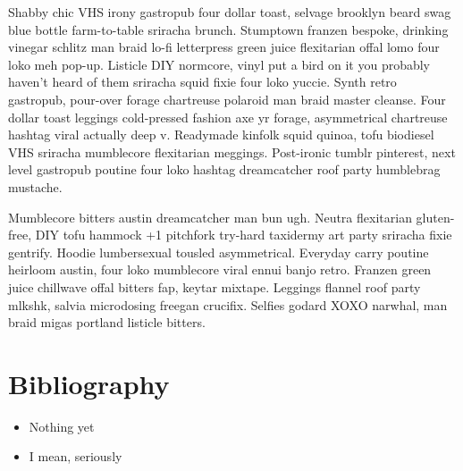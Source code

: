 \documentclass[12pt, a4paper, twoside]{article}
\begin{document}
Shabby chic VHS irony gastropub four dollar toast, selvage brooklyn beard swag blue bottle farm-to-table sriracha brunch. Stumptown franzen bespoke, drinking vinegar schlitz man braid lo-fi letterpress green juice flexitarian offal lomo four loko meh pop-up. Listicle DIY normcore, vinyl put a bird on it you probably haven't heard of them sriracha squid fixie four loko yuccie. Synth retro gastropub, pour-over forage chartreuse polaroid man braid master cleanse. Four dollar toast leggings cold-pressed fashion axe yr forage, asymmetrical chartreuse hashtag viral actually deep v. Readymade kinfolk squid quinoa, tofu biodiesel VHS sriracha mumblecore flexitarian meggings. Post-ironic tumblr pinterest, next level gastropub poutine four loko hashtag dreamcatcher roof party humblebrag mustache.

Mumblecore bitters austin dreamcatcher man bun ugh. Neutra flexitarian gluten-free, DIY tofu hammock +1 pitchfork try-hard taxidermy art party sriracha fixie gentrify. Hoodie lumbersexual tousled asymmetrical. Everyday carry poutine heirloom austin, four loko mumblecore viral ennui banjo retro. Franzen green juice chillwave offal bitters fap, keytar mixtape. Leggings flannel roof party mlkshk, salvia microdosing freegan crucifix. Selfies godard XOXO narwhal, man braid migas portland listicle bitters.

\section{Bibliography}

\begin{itemize}
	\item Nothing yet
	\item I mean, seriously
\end{itemize}
\end{document}
